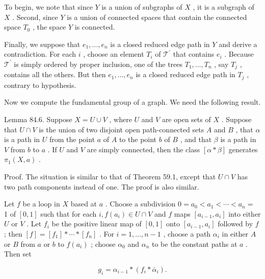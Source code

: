 To begin, we note that since \(Y\) is a union of subgraphs of \(X\) , it is a subgraph of \(X\) . Second, since \(Y\) is a union of connected spaces that contain the connected space \({T}_{0}\) , the space \(Y\) is connected.

Finally, we suppose that \({e}_{1},\ldots ,{e}_{n}\) is a closed reduced edge path in \(Y\) and derive a contradiction. For each \(i\) , choose an element \({T}_{i}\) of \({\mathcal{T}}^{\prime }\) that contains \({e}_{i}\) . Because \({\mathcal{T}}^{\prime }\) is simply ordered by proper inclusion, one of the trees \({T}_{1},\ldots ,{T}_{n}\) , say \({T}_{j}\) , contains all the others. But then \({e}_{1},\ldots ,{e}_{n}\) is a closed reduced edge path in \({T}_{j}\) , contrary to hypothesis.

Now we compute the fundamental group of a graph. We need the following result.

Lemma 84.6. Suppose \(X = U \cup  V\) , where \(U\) and \(V\) are open sets of \(X\) . Suppose that \(U \cap  V\) is the union of two disjoint open path-connected sets \(A\) and \(B\) , that \(\alpha\) is a path in \(U\) from the point \(a\) of \(A\) to the point \(b\) of \(B\) , and that \(\beta\) is a path in \(V\) from \(b\) to \(a\) . If \(U\) and \(V\) are simply connected, then the class \(\left\lbrack  {\alpha  * \beta }\right\rbrack\) generates \({\pi }_{1}\left( {X,a}\right)\) .

Proof. The situation is similar to that of Theorem 59.1, except that \(U \cap  V\) has two path components instead of one. The proof is also similar.

Let \(f\) be a loop in \(X\) based at \(a\) . Choose a subdivision \(0 = {a}_{0} < {a}_{1} < \cdots  < {a}_{n} =\) 1 of \(\left\lbrack  {0,1}\right\rbrack\) such that for each \(i,f\left( {a}_{i}\right)  \in  U \cap  V\) and \(f\) maps \(\left\lbrack  {{a}_{i - 1},{a}_{i}}\right\rbrack\) into either \(U\) or \(V\) . Let \({f}_{i}\) be the positive linear map of \(\left\lbrack  {0,1}\right\rbrack\) onto \(\left\lbrack  {{a}_{i - 1},{a}_{i}}\right\rbrack\) followed by \(f\) ; then \(\left\lbrack  f\right\rbrack   = \left\lbrack  {f}_{1}\right\rbrack   * \cdots  * \left\lbrack  {f}_{n}\right\rbrack\) . For \(i = 1,\ldots ,n - 1\) , choose a path \({\alpha }_{i}\) in either \(A\) or \(B\) from \(a\) or \(b\) to \(f\left( {a}_{i}\right)\) ; choose \({\alpha }_{0}\) and \({\alpha }_{n}\) to be the constant paths at \(a\) . Then set

\[
{g}_{i} = {\alpha }_{i - 1} * \left( {{f}_{i} * {\bar{\alpha }}_{i}}\right) .
\]

